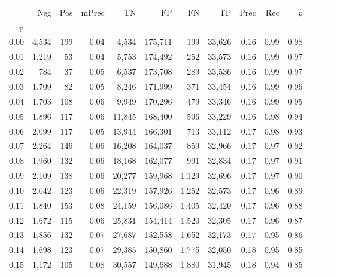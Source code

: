\begin{tabular}{rrrrrrrrrrrrrr}
\toprule
{} &    Neg &  Pos & mPrec &       TN &       FP &      FN &      TP &  Prec &   Rec & $\hat{p}$ \\
p    &        &      &       &          &          &         &         &       &       &           \\
\midrule
0.00 &  4,534 &  199 &  0.04 &    4,534 &  175,711 &     199 &  33,626 &  0.16 &  0.99 &      0.98 \\
0.01 &  1,219 &   53 &  0.04 &    5,753 &  174,492 &     252 &  33,573 &  0.16 &  0.99 &      0.97 \\
0.02 &    784 &   37 &  0.05 &    6,537 &  173,708 &     289 &  33,536 &  0.16 &  0.99 &      0.97 \\
0.03 &  1,709 &   82 &  0.05 &    8,246 &  171,999 &     371 &  33,454 &  0.16 &  0.99 &      0.96 \\
0.04 &  1,703 &  108 &  0.06 &    9,949 &  170,296 &     479 &  33,346 &  0.16 &  0.99 &      0.95 \\
0.05 &  1,896 &  117 &  0.06 &   11,845 &  168,400 &     596 &  33,229 &  0.16 &  0.98 &      0.94 \\
0.06 &  2,099 &  117 &  0.05 &   13,944 &  166,301 &     713 &  33,112 &  0.17 &  0.98 &      0.93 \\
0.07 &  2,264 &  146 &  0.06 &   16,208 &  164,037 &     859 &  32,966 &  0.17 &  0.97 &      0.92 \\
0.08 &  1,960 &  132 &  0.06 &   18,168 &  162,077 &     991 &  32,834 &  0.17 &  0.97 &      0.91 \\
0.09 &  2,109 &  138 &  0.06 &   20,277 &  159,968 &   1,129 &  32,696 &  0.17 &  0.97 &      0.90 \\
0.10 &  2,042 &  123 &  0.06 &   22,319 &  157,926 &   1,252 &  32,573 &  0.17 &  0.96 &      0.89 \\
0.11 &  1,840 &  153 &  0.08 &   24,159 &  156,086 &   1,405 &  32,420 &  0.17 &  0.96 &      0.88 \\
0.12 &  1,672 &  115 &  0.06 &   25,831 &  154,414 &   1,520 &  32,305 &  0.17 &  0.96 &      0.87 \\
0.13 &  1,856 &  132 &  0.07 &   27,687 &  152,558 &   1,652 &  32,173 &  0.17 &  0.95 &      0.86 \\
0.14 &  1,698 &  123 &  0.07 &   29,385 &  150,860 &   1,775 &  32,050 &  0.18 &  0.95 &      0.85 \\
0.15 &  1,172 &  105 &  0.08 &   30,557 &  149,688 &   1,880 &  31,945 &  0.18 &  0.94 &      0.85 \\

\end{tabular}
